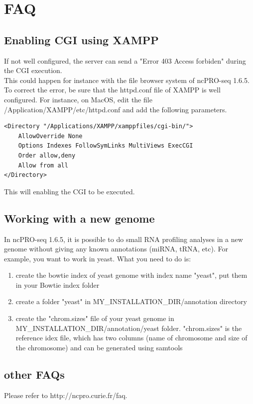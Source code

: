 \documentclass[12pt]{article}
\def \ncpip{ncPRO-seq 1.6.5}
\begin{document}
\section{FAQ}
\subsection{Enabling CGI using XAMPP}
If not well configured, the server can send a "Error 403 Access forbiden" during the CGI execution.\\
This could happen for instance with the file browser system of \ncpip{}. To correct the error, be sure that the httpd.conf file of XAMPP is well configured.
For instance, on MacOS, edit the file /Application/XAMPP/etc/httpd.conf and add the following parameters.
\begin{verbatim}
<Directory "/Applications/XAMPP/xamppfiles/cgi-bin/">
    AllowOverride None
    Options Indexes FollowSymLinks MultiViews ExecCGI
    Order allow,deny
    Allow from all
</Directory>
\end{verbatim}
This will enabling the CGI to be executed.

\subsection{Working with a new genome}

In \ncpip{}, it is possible to do small RNA profiling analyses in a new genome without giving any known annotations (miRNA, tRNA, etc). For example, you want to work in yeast. What you need to do is:
\begin{enumerate}
 \item create the bowtie index of yeast genome with index name "yeast", put them in your Bowtie index folder
 \item create a folder "yeast" in MY\_INSTALLATION\_DIR/annotation directory
 \item create the "chrom.sizes" file of your yeast genome in MY\_INSTALLATION\_DIR/annotation/yeast folder. "chrom.sizes" is the reference idex file, which has two columns (name of chromosome and size of the chromosome) and can be generated using samtools 
\end{enumerate}

\subsection{other FAQs}
 
Please refer to http://ncpro.curie.fr/faq.




\nocite{*}
\end{document}
